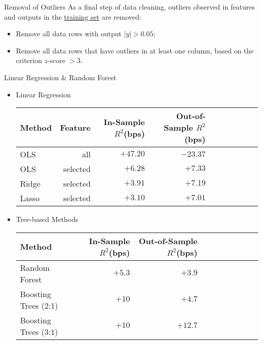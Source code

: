 \documentclass{beamer}
\begin{document}
\begin{frame}{Removal of Outliers}
As a final step of data cleaning, outliers observed in features and outputs in the \underline{training set} are removed:
\begin{itemize}[noitemsep]
\item Remove all data rows with output $|y|>0.05$;
\item Remove all data rows that have outliers in at least one column, based on the criterion $z$-score $>3$.
\end{itemize}

\end{frame}

\begin{frame}{Linear Regression \& Random Forest}
\begin{itemize}
\item Linear Regression
\vspace{5 mm}

	\begin{tabular}{lrrrrrrrrr}  
		\toprule
		Method & Feature & In-Sample $R^2$(bps) & Out-of-Sample $R^2$(bps) \\
		\midrule
	    OLS & all  & $+47.20$	& $-23.37$	 \\
		OLS & selected  & $+6.28$	& $+7.33$	 \\
		Ridge & selected  & 	$+3.91$ & $+7.19$	  \\
		Lasso & selected  & $+3.10$	& $+7.01$	 \\
		\bottomrule
	\end{tabular}
\vspace{5 mm}	
\item Tree-based Methods

\vspace{5 mm}
	
	\begin{tabular}{lrrrrrrrrr}  
		\toprule
		Method & In-Sample $R^2$(bps) & Out-of-Sample $R^2$(bps) \\
		\midrule
	    Random Forest  & $+5.3$	& $+3.9$	 \\
		Boosting Trees (2:1) & $+10$	& $+4.7$	 \\
		Boosting Trees (3:1)  & $+10$	& $+12.7$	 \\
		\bottomrule
	\end{tabular}
\end{itemize}

\end{frame}
\end{document}
